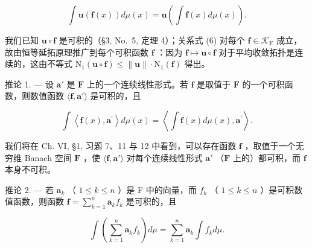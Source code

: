 \[
\int \mathbf {u} (\mathbf {f} (x)) d \mu (x) = \mathbf {u} \left(\int \mathbf {f} (x) d \mu (x)\right).\tag{6}
\]

我们已知 \(\mathbf{u} \circ \mathbf{f}\) 是可积的（§3, No.~5, 定理 4）；关系式 (6) 对每个 \(\mathbf{f} \in \mathcal{K}_{\mathrm{F}}\) 成立，故由恒等延拓原理推广到每个可积函数 \(\mathbf{f}\) ：因为 \(\mathbf{f} \mapsto \mathbf{u} \circ \mathbf{f}\) 对于平均收敛拓扑是连续的，这由不等式 \(\mathrm{N}_1(\mathbf{u} \circ \mathbf{f}) \leqslant \| \mathbf{u} \| \cdot \mathrm{N}_1(\mathbf{f})\) 得出。

推论 1. --- 设 \(\mathbf{a}'\) 是 \(\mathbf{F}\) 上的一个连续线性形式。若 \(\mathbf{f}\) 是取值于 \(\mathbf{F}\) 的一个可积函数，则数值函数 \(\langle \mathbf{f}, \mathbf{a}' \rangle\) 是可积的，且

\[
\int \left\langle \mathbf {f} (x), \mathbf {a} ^ {\prime} \right\rangle d \mu (x) = \left\langle \int \mathbf {f} (x) d \mu (x), \mathbf {a} ^ {\prime} \right\rangle .\tag{7}
\]

我们将在 Ch. VI, §1, 习题 7、11 与 12 中看到，可以存在函数 \(\mathbf{f}\) ，取值于一个无穷维 Banach 空间 \(\mathbf{F}\) ，使 \(\langle \mathbf{f}, \mathbf{a}' \rangle\) 对每个连续线性形式 \(\mathbf{a}'\) （\(\mathbf{F}\) 上的）都可积，而 \(\mathbf{f}\) 本身不可积。

推论 2. --- 若 \(\mathbf{a}_k\) （ \(1 \leqslant k \leqslant n\) ）是 F 中的向量，而 \(f_k\) （ \(1 \leqslant k \leqslant n\) ）是可积数值函数，则函数 \(\mathbf{f} = \sum_{k=1}^{n} \mathbf{a}_k f_k\) 是可积的，且

\[
\int \left(\sum_ {k = 1} ^ {n} \mathbf {a} _ {k} f _ {k}\right) d \mu = \sum_ {k = 1} ^ {n} \mathbf {a} _ {k} \int f _ {k} d \mu .\tag{8}
\]

